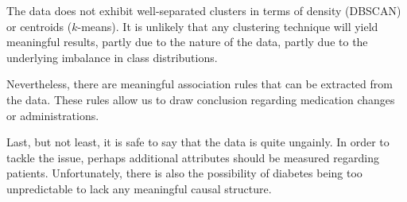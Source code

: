 \documentclass{article}\usepackage[]{graphicx}\usepackage[]{color}
\begin{document}
The data does not exhibit well-separated clusters in terms of density (DBSCAN)
or centroids ($k$-means).  It is unlikely that any clustering technique will
yield meaningful results, partly due to the nature of the data, partly due to
the underlying imbalance in class distributions.

Nevertheless, there are meaningful association rules that can be extracted from
the data.  These rules allow us to draw conclusion regarding medication changes
or administrations.

Last, but not least, it is safe to say that the data is quite ungainly.  In
order to tackle the issue, perhaps additional attributes should be measured
regarding patients.  Unfortunately, there is also the possibility of diabetes
being too unpredictable to lack any meaningful causal structure.

\printbibliography[heading=bibintoc]
\end{document}
